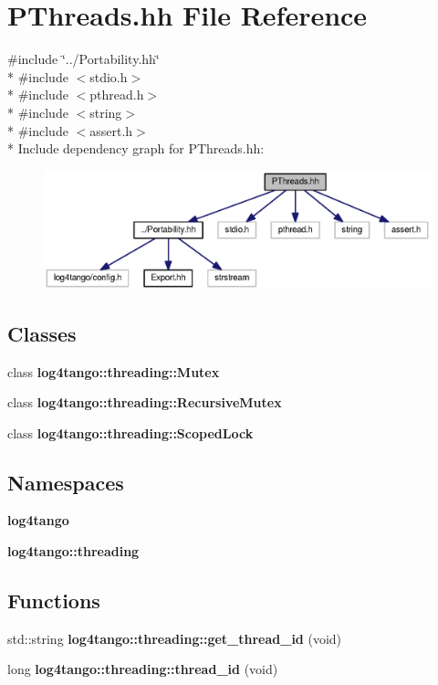 \section{P\-Threads.\-hh File Reference}
\label{PThreads_8hh}
{\ttfamily \#include \char`\"{}../\-Portability.\-hh\char`\"{}}\\*
{\ttfamily \#include $<$stdio.\-h$>$}\\*
{\ttfamily \#include $<$pthread.\-h$>$}\\*
{\ttfamily \#include $<$string$>$}\\*
{\ttfamily \#include $<$assert.\-h$>$}\\*
Include dependency graph for P\-Threads.\-hh\-:
\nopagebreak
\begin{figure}[H]
\begin{center}
\leavevmode
\includegraphics[width=350pt]{de/d2e/PThreads_8hh__incl}
\end{center}
\end{figure}
\subsection*{Classes}
\begin{DoxyCompactItemize}
\item 
class {\bf log4tango\-::threading\-::\-Mutex}
\item 
class {\bf log4tango\-::threading\-::\-Recursive\-Mutex}
\item 
class {\bf log4tango\-::threading\-::\-Scoped\-Lock}
\end{DoxyCompactItemize}
\subsection*{Namespaces}
\begin{DoxyCompactItemize}
\item 
{\bf log4tango}
\item 
{\bf log4tango\-::threading}
\end{DoxyCompactItemize}
\subsection*{Functions}
\begin{DoxyCompactItemize}
\item 
std\-::string {\bf log4tango\-::threading\-::get\-\_\-thread\-\_\-id} (void)
\item 
long {\bf log4tango\-::threading\-::thread\-\_\-id} (void)
\end{DoxyCompactItemize}
